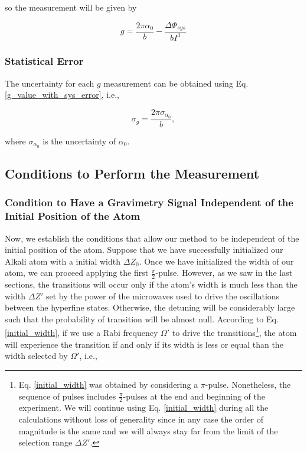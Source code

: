 \documentclass{article}
\begin{document}
so the measurement will be given by

\begin{equation}\label{g_value_with_sys_error}
    g = \frac{2\pi \alpha_{0}}{b} - \frac{\Delta \Phi_{sys}}{b I^3}
\end{equation}

\subsubsection{Statistical Error}
The uncertainty for each $g$ measurement can be obtained using Eq. \ref{g_value_with_sys_error}, i.e.,

\begin{equation}
    \sigma_{g} = \frac{2\pi \sigma_{\alpha_{0}}}{b},
\end{equation}

where $\sigma_{\alpha_{0}}$ is the uncertainty of $\alpha_{0}$.

\subsection{Conditions to Perform the Measurement}

\subsubsection{Condition to Have a Gravimetry Signal Independent of the Initial Position of the Atom}
Now, we establish the conditions that allow our method to be independent of the initial position of the atom.
Suppose that we have successfully initialized our Alkali atom with a initial width $\Delta Z_{0}$. Once we have initialized the width of our atom, we can proceed applying the first $\frac{\pi}{2}$-pulse. However, as we saw in the last sections, the transitions will occur only if the atom's width is much less than the width $\Delta Z'$ set by the power of the microwaves used to drive the oscillations between the hyperfine states. Otherwise, the detuning will be considerably large such that the probability of transition will be almost null. According to Eq. \ref{initial_width}, if we use a Rabi frequency $\Omega'$ to drive the transitions\footnote{Eq. \ref{initial_width} was obtained by considering a $\pi$-pulse. Nonetheless, the sequence of pulses includes $\frac{\pi}{2}$-pulses at the end and beginning of the experiment. We will continue using Eq. \ref{initial_width} during all the calculations without loss of generality since in any case the order of magnitude is the same and we will always stay far from the limit of the selection range $\Delta Z'$.}, the atom will experience the transition if and only if its width is less or equal than the width selected by $\Omega'$, i.e.,
\end{document}
